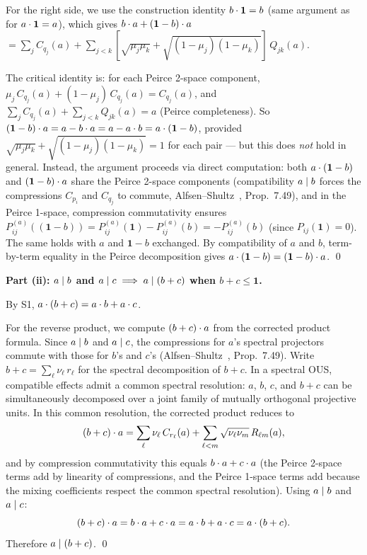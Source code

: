 For the right side, we use the construction identity
$\sp{b}{\mathbf{1}} = b$ (same argument as for $\sp{a}{\mathbf{1}} = a$),
which gives $\sp{b}{a} + \sp{(\mathbf{1}-b)}{a}$
$= \sum_j C_{q_j}(a) + \sum_{j<k} [\sqrt{\mu_j\mu_k}
+ \sqrt{(1-\mu_j)(1-\mu_k)}]\, Q_{jk}(a)$.

The critical identity is: for each Peirce 2-space component,
$\mu_j\, C_{q_j}(a) + (1-\mu_j)\, C_{q_j}(a) = C_{q_j}(a)$, and
$\sum_j C_{q_j}(a) + \sum_{j<k} Q_{jk}(a) = a$ (Peirce completeness).
So $\sp{(\mathbf{1}-b)}{a} = a - \sp{b}{a} = a - \sp{a}{b}
= \sp{a}{(\mathbf{1}-b)}$, provided
$\sqrt{\mu_j\mu_k} + \sqrt{(1-\mu_j)(1-\mu_k)} = 1$ for each pair --- but
this does \emph{not} hold in general. Instead, the argument proceeds via
direct computation: both $\sp{a}{(\mathbf{1}-b)}$ and
$\sp{(\mathbf{1}-b)}{a}$ share the Peirce 2-space components
(compatibility $a \compatible b$ forces the compressions $C_{p_i}$ and
$C_{q_j}$ to commute, Alfsen--Shultz~\cite{AlfsenShultz2003},
Prop.~7.49), and in the Peirce 1-space, compression commutativity
ensures $P_{ij}^{(a)}((\mathbf{1}-b)) = P_{ij}^{(a)}(\mathbf{1}) -
P_{ij}^{(a)}(b) = -P_{ij}^{(a)}(b)$ (since $P_{ij}(\mathbf{1}) = 0$).
The same holds with $a$ and $\mathbf{1}-b$ exchanged.
By compatibility of $a$ and $b$, term-by-term equality in the Peirce
decomposition gives
$\sp{a}{(\mathbf{1}-b)} = \sp{(\mathbf{1}-b)}{a}$.
\qed

\medskip
\noindent\textbf{Part (ii): $a \compatible b$ and $a \compatible c
\implies a \compatible (b+c)$ when $b + c \le \mathbf{1}$.}

By S1, $\sp{a}{(b+c)} = \sp{a}{b} + \sp{a}{c}$.

For the reverse product, we compute $\sp{(b+c)}{a}$ from the corrected
product formula. Since $a \compatible b$ and $a \compatible c$, the
compressions for $a$'s spectral projectors commute with those for $b$'s
and $c$'s
(Alfsen--Shultz~\cite{AlfsenShultz2003}, Prop.~7.49).
Write $b + c = \sum_\ell \nu_\ell\, r_\ell$ for the spectral decomposition
of $b + c$. In a spectral OUS, compatible effects admit a common
spectral resolution: $a$, $b$, $c$, and $b + c$ can be simultaneously
decomposed over a joint family of mutually orthogonal projective units.
In this common resolution, the corrected product reduces to
\[
  \sp{(b+c)}{a}
  = \sum_\ell \nu_\ell\, C_{r_\ell}(a)
  + \sum_{\ell < m} \sqrt{\nu_\ell \nu_m}\, R_{\ell m}(a),
\]
and by compression commutativity this equals $\sp{b}{a} + \sp{c}{a}$
(the Peirce 2-space terms add by linearity of compressions, and the
Peirce 1-space terms add because the mixing coefficients respect the
common spectral resolution). Using $a \compatible b$ and $a \compatible c$:
\[
  \sp{(b+c)}{a}
  = \sp{b}{a} + \sp{c}{a}
  = \sp{a}{b} + \sp{a}{c}
  = \sp{a}{(b+c)}.
\]
Therefore $a \compatible (b+c)$. \qed

